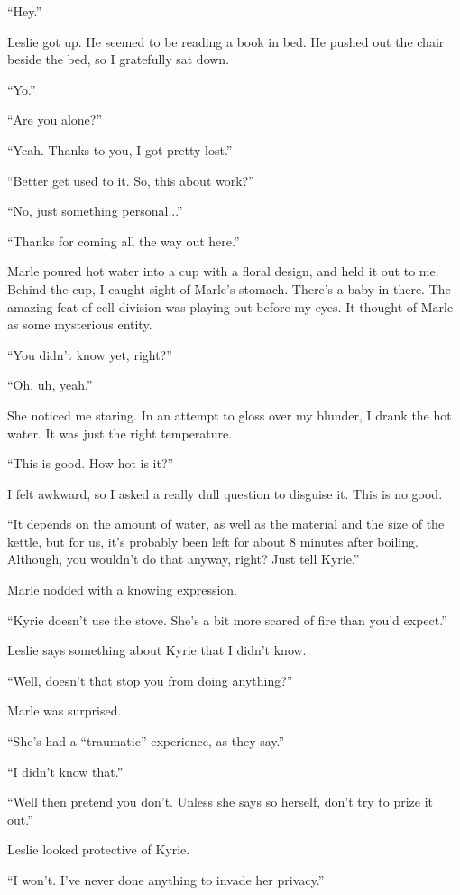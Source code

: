 \documentclass[oneside]{book}
\begin{document}
“Hey.”

Leslie got up. He seemed to be reading a book in bed. He pushed out the chair beside the bed, so I gratefully sat down.

“Yo.”

“Are you alone?”

“Yeah. Thanks to you, I got pretty lost.”

“Better get used to it. So, this about work?”

“No, just something personal...”

“Thanks for coming all the way out here.”

Marle poured hot water into a cup with a floral design, and held it out to me. Behind the cup, I caught sight of Marle’s stomach. There’s a baby in there. The amazing feat of cell division was playing out before my eyes. It thought of Marle as some mysterious entity.

“You didn’t know yet, right?”

“Oh, uh, yeah.”

She noticed me staring. In an attempt to gloss over my blunder, I drank the hot water. It was just the right temperature.

“This is good. How hot is it?”

I felt awkward, so I asked a really dull question to disguise it. This is no good.

“It depends on the amount of water, as well as the material and the size of the kettle, but for us, it’s probably been left for about 8 minutes after boiling. Although, you wouldn’t do that anyway, right? Just tell Kyrie.”

Marle nodded with a knowing expression.

“Kyrie doesn’t use the stove. She’s a bit more scared of fire than you’d expect.”

Leslie says something about Kyrie that I didn’t know.

“Well, doesn’t that stop you from doing anything?”

Marle was surprised.

“She’s had a “traumatic” experience, as they say.”

“I didn’t know that.”

“Well then pretend you don’t. Unless she says so herself, don’t try to prize it out.”

Leslie looked protective of Kyrie.

“I won’t. I’ve never done anything to invade her privacy.”
\end{document}
